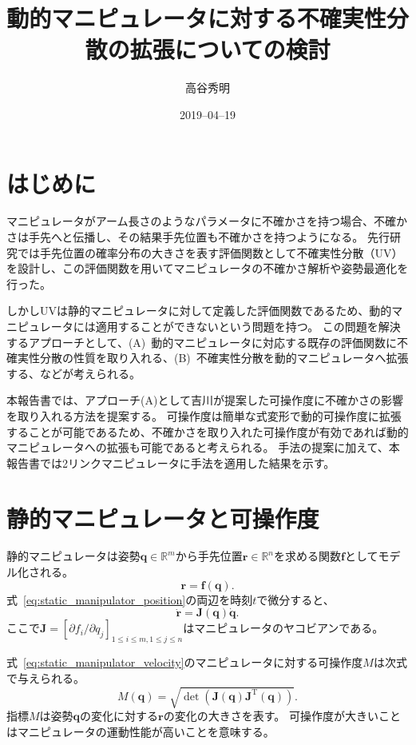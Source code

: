 \documentclass[10pt,a4j,twocolumn]{ltjsarticle}
\title{動的マニピュレータに対する不確実性分散の拡張についての検討} %
\author{高谷秀明}                              %
\date{2019--04--19}                              %
\begin{document}
\maketitle

\section{はじめに}

マニピュレータがアーム長さのようなパラメータに不確かさを持つ場合、不確かさは手先へと伝播し、その結果手先位置も不確かさを持つようになる。
先行研究では手先位置の確率分布の大きさを表す評価関数として不確実性分散（UV）を設計し、この評価関数を用いてマニピュレータの不確かさ解析や姿勢最適化を行った。

しかしUVは静的マニピュレータに対して定義した評価関数であるため、動的マニピュレータには適用することができないという問題を持つ。
この問題を解決するアプローチとして、(A)~動的マニピュレータに対応する既存の評価関数に不確実性分散の性質を取り入れる、(B)~不確実性分散を動的マニピュレータへ拡張する、などが考えられる。

本報告書では、アプローチ(A)として吉川が提案した可操作度に不確かさの影響を取り入れる方法を提案する。
可操作度は簡単な式変形で動的可操作度に拡張することが可能であるため、不確かさを取り入れた可操作度が有効であれば動的マニピュレータへの拡張も可能であると考えられる。
手法の提案に加えて、本報告書では2リンクマニピュレータに手法を適用した結果を示す。

\section{静的マニピュレータと可操作度}

静的マニピュレータは姿勢$\bm{q} \in \mathbb{R}^{m}$から手先位置$\bm{r} \in \mathbb{R}^{n}$を求める関数$\bm{f}$としてモデル化される。
\begin{equation}
  \bm{r} = \bm{f}(\bm{q}). \label{eq:static_manipulator_position}
\end{equation}
式~\eqref{eq:static_manipulator_position}の両辺を時刻$t$で微分すると、
\begin{equation}
  \dot{\bm{r}} = \bm{J}(\bm{q}) \dot{\bm{q}}. \label{eq:static_manipulator_velocity}
\end{equation}
ここで$\bm{J} = [\partial f_{i} / \partial q_{j}]_{1 \leq i \leq m, 1 \leq j \leq n}$はマニピュレータのヤコビアンである。

式~\eqref{eq:static_manipulator_velocity}のマニピュレータに対する可操作度$M$は次式で与えられる。
\begin{equation}
  M(\bm{q}) = \sqrt{\det \left( \bm{J}(\bm{q}) \bm{J}^{\mathrm{T}}(\bm{q}) \right)}.
\end{equation}
指標$M$は姿勢$\bm{q}$の変化に対する$\bm{r}$の変化の大きさを表す。
可操作度が大きいことはマニピュレータの運動性能が高いことを意味する。
\end{document}
